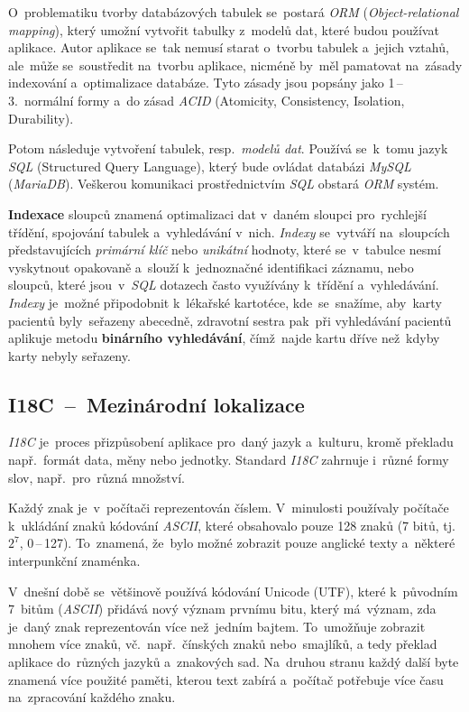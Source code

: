 \documentclass[10pt,a4paper]{article}
\begin{document}
        O~problematiku tvorby databázových tabulek se~postará \emph{ORM} (\emph{Object-relational mapping}), který umožní vytvořit tabulky z~modelů dat, které budou používat aplikace. Autor aplikace se~tak nemusí starat o~tvorbu tabulek a~jejich vztahů, ale~může se~soustředit na~tvorbu aplikace, nicméně by~měl pamatovat na~zásady indexování a~optimalizace databáze. Tyto zásady jsou popsány jako 1\,--\,3.~normální formy a~do zásad \emph{ACID} (Atomicity, Consistency, Isolation, Durability). \cite{interval:normalniformydb, bmcACIDExplained}

        Potom následuje vytvoření tabulek, resp.~\emph{modelů dat}. Používá se~k~tomu jazyk \emph{SQL} (Structured Query Language), který bude ovládat databázi \emph{MySQL} (\emph{MariaDB}). Veškerou komunikaci prostřednictvím \emph{SQL} obstará \emph{ORM} systém.

        \textbf{Indexace} sloupců znamená optimalizaci dat v~daném sloupci pro~rychlejší třídění, spojování tabulek a~vyhledávání v~nich. \emph{Indexy} se~vytváří na~sloupcích představujících \emph{primární klíč} nebo \emph{unikátní} hodnoty, které se~v~tabulce nesmí vyskytnout opakovaně a~slouží k~jednoznačné identifikaci záznamu, nebo sloupců, které jsou~v~\emph{SQL} dotazech často využívány k~třídění a~vyhledávání. \emph{Indexy} je~možné připodobnit k~lékařské kartotéce, kde~se~snažíme, aby~karty pacientů byly~seřazeny abecedně, zdravotní sestra pak~při vyhledávání pacientů aplikuje metodu \textbf{binárního vyhledávání}, čímž~najde kartu dříve než~kdyby karty nebyly seřazeny. \cite{interval:normalniformydb, laurencik2018sql}

        \subsection{I18C~--~Mezinárodní lokalizace}
        \emph{I18C} je~proces přizpůsobení aplikace pro~daný jazyk a~kulturu, kromě překladu např.~formát data, měny nebo jednotky. Standard \emph{I18C} zahrnuje i~různé formy slov, např.~pro~různá množství. \cite{w3Internationalization}

        Každý znak je~v~počítači reprezentován číslem. V~minulosti používaly počítače k~ukládání znaků kódování \emph{ASCII}, které obsahovalo pouze 128 znaků (7 bitů, tj.~$2^7$, 0\,--\,127). To~znamená, že~bylo možné zobrazit pouze anglické texty a~některé interpunkční znaménka. 
        
        V~dnešní době se~většinově používá kódování Unicode (UTF), které k~původním 7~bitům (\emph{ASCII}) přidává nový význam prvnímu bitu, který má~význam, zda je~daný znak reprezentován více než~jedním bajtem. To~umožňuje zobrazit mnohem více znaků, vč.~např.~čínských znaků nebo~smajlíků, a tedy překlad aplikace do~různých jazyků a~znakových sad. Na~druhou stranu každý další byte znamená více použité paměti, kterou text zabírá a~počítač potřebuje více času na~zpracování každého znaku.
        
\end{document}
